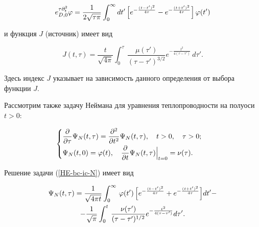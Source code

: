 \begin{equation*}


e^{\tau\partial^2_t}_{D,0}\varphi=

\frac{1}{2\sqrt{\tau\pi} } 

\int_0^\infty

dt'\,\Bigl[e^{-\frac{(t-t')^2}{4\tau}}-e^{-\frac{(t+t')^2}{4\tau}}\Bigr] \,\varphi(t')

\end{equation*}

и функция $J$ (источник) имеет вид

\begin{equation*}

J(t,\tau)=\frac{t}{\sqrt{4\pi }}\int _0^{\tau}\,

\frac{\mu(\tau')}{(\tau-\tau')^{3/2}}e^{-\frac{t^2}

{4(\tau

-\tau')}}\,d\tau'.


\end{equation*}

Здесь индекс $J$ указывает на зависимость данного определения от выбора функции $J$.





Рассмотрим также задачу Неймана для уравнения теплопроводности на полуоси $t>0$:

\begin{equation}

\label{HE-bc-ic-N}

\begin{cases}

\displaystyle\frac{\partial}{\partial \tau}\Psi_N(t,\tau)=

\frac{\partial^2}{\partial t^2}\Psi_N(t,\tau),\quad t>0,\quad \tau>0;\vspace{1mm} \\

\displaystyle

\Psi_{N}(t, 0)=\varphi(t),\quad 

\frac{\partial}{\partial t}\Psi_N(t,\tau)\Big|_{t=0}=\nu(\tau).

\end{cases}\end{equation}

Решение задачи (\ref{HE-bc-ic-N}) имеет вид

\begin{multline*}

\Psi_N(t,\tau)=\frac{1}{\sqrt{4\pi t}}\int _0^\infty \,\varphi (t')\,

\Bigl[e^{-\frac{(t-t')^2}{4\tau}}+e^{-\frac{(t+t')^2}{4\tau}}\Bigr]dt' -


\\

-\frac{1}{\sqrt{\pi }}\int _0^t\,

\frac{\nu(\tau')}{(\tau-\tau')^{1/2}}e^{-\frac{t^2}{4(\tau-\tau ')}}d\tau'.

\end{multline*}

